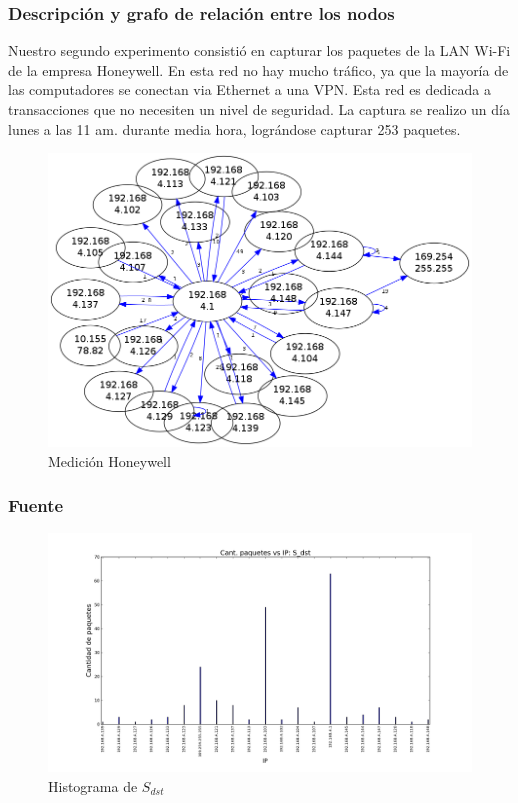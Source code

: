 \subsubsection{Descripción y grafo de relación entre los nodos}

Nuestro segundo experimento consistió en capturar los paquetes de la LAN Wi-Fi de la empresa Honeywell. En esta red no hay mucho tráfico, ya que la mayoría de las computadores se conectan via Ethernet a una VPN. Esta red es dedicada a transacciones que no necesiten un nivel de seguridad. La captura se realizo un día lunes a las 11 am. durante media hora, lográndose capturar 253 paquetes.  

\begin{figure}[H]
 \begin{center}
  \includegraphics[width=0.7\linewidth]{../imgs/red-honeywell_red.png}
  \caption{Medición Honeywell}
 \end{center}
\end{figure}


\subsubsection{Fuente}

\begin{figure}[H]\centering
    \includegraphics[width=0.8\linewidth]{../imgs/red-honeywell_S_dst_hist.png}
    \caption{Histograma de $S_{dst}$}\label{fig:Honeywell-dst-hist}
\end{figure}

